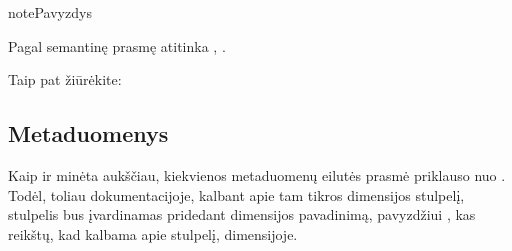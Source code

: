 \documentclass[letterpaper,10pt,lithuanian]{sphinxmanual}
\begin{document}
\begin{fulllineitems}
\begin{description}
\begin{sphinxadmonition}{note}{Pavyzdys}
\begin{DUlineblock}{0em}
\item[] 
\item[] 
\end{DUlineblock}
\end{sphinxadmonition}

\end{description}

\sphinxAtStartPar
Pagal semantinę prasmę atitinka ,
.


\begin{sphinxseealso}{Taip pat žiūrėkite:}

\begin{DUlineblock}{0em}
\item[] {\hyperref[\detokenize{dimensijos:property}]{}}
\end{DUlineblock}


\end{sphinxseealso}


\end{fulllineitems}



\subsection{Metaduomenys}
\label{\detokenize{formatas:metaduomenys}}\label{\detokenize{formatas:metaduomenu-stulpeliai}}
\sphinxAtStartPar
Kaip ir minėta aukščiau, kiekvienos metaduomenų eilutės prasmė priklauso nuo
{\hyperref[\detokenize{dimensijos:dimensijos}]{}}. Todėl, toliau dokumentacijoje, kalbant apie tam tikros
dimensijos stulpelį, stulpelis bus įvardinamas pridedant dimensijos
pavadinimą, pavyzdžiui {\hyperref[\detokenize{dimensijos:model.ref}]{}}, kas reikštų, kad kalbama apie
{\hyperref[\detokenize{formatas:ref}]{}} stulpelį, {\hyperref[\detokenize{formatas:model}]{}} dimensijoje.
\end{document}

